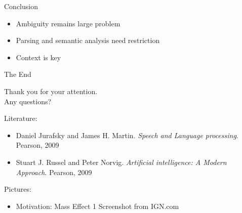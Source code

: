 \documentclass[14pt]{beamer}
\theoremstyle{remark}
\begin{document}
\begin{frame}[t]{Conclusion}
	\begin{itemize}
		\item Ambiguity remains large problem
		\item Parsing and semantic analysis need restriction
		\item Context is key
	\end{itemize}
\end{frame}


\begin{frame}[c]{The End}
	\begin{center}
		Thank you for your attention.\\[1ex]
		Any questions?\\[5ex]
	\end{center}
	\footnotesize
	Literature:
	\begin{itemize}
		\item Daniel Jurafsky and James H. Martin. \emph{Speech and Language processing}. Pearson, 2009
		\item Stuart J. Russel and Peter Norvig. \emph{Artificial intelligence: A Modern Approach}. Pearson, 2009
	\end{itemize}
	Pictures:
	\begin{itemize}
		\item Motivation: Mass Effect 1 Screenshot from IGN.com
	\end{itemize}
\end{frame}
\end{document}
